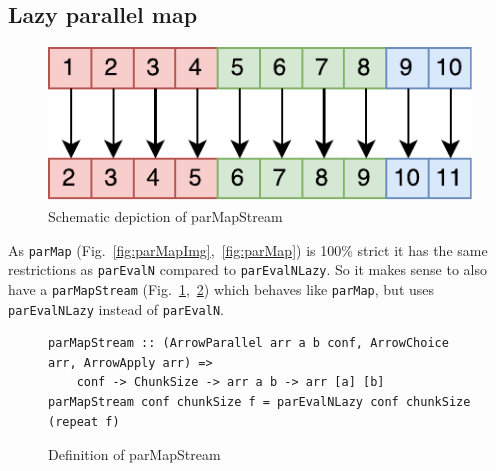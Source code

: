 \documentclass{jfp1}
\newcommand{\inlinecode}[1]{\texttt{#1}}
\begin{document}
\subsection{Lazy parallel map}
\begin{figure}[h]
	\includegraphics[scale=0.7]{images/parMapStream}
	\caption{Schematic depiction of parMapStream}
	\label{fig:parMapStreamImg}
\end{figure}
As \inlinecode{parMap} (Fig.~\ref{fig:parMapImg},~\ref{fig:parMap}) is 100\% strict it has the same restrictions as \inlinecode{parEvalN} compared to \inlinecode{parEvalNLazy}. So it makes sense to also have a \inlinecode{parMapStream} (Fig.~\ref{fig:parMapStreamImg},~\ref{fig:parMapStream}) which behaves like \inlinecode{parMap}, but uses \inlinecode{parEvalNLazy} instead of \inlinecode{parEvalN}.
\begin{figure}[h]
\begin{lstlisting}[frame=htrbl]
parMapStream :: (ArrowParallel arr a b conf, ArrowChoice arr, ArrowApply arr) =>
	conf -> ChunkSize -> arr a b -> arr [a] [b]
parMapStream conf chunkSize f = parEvalNLazy conf chunkSize (repeat f)
\end{lstlisting}
\caption{Definition of parMapStream}
\label{fig:parMapStream}
\end{figure}
\end{document}
